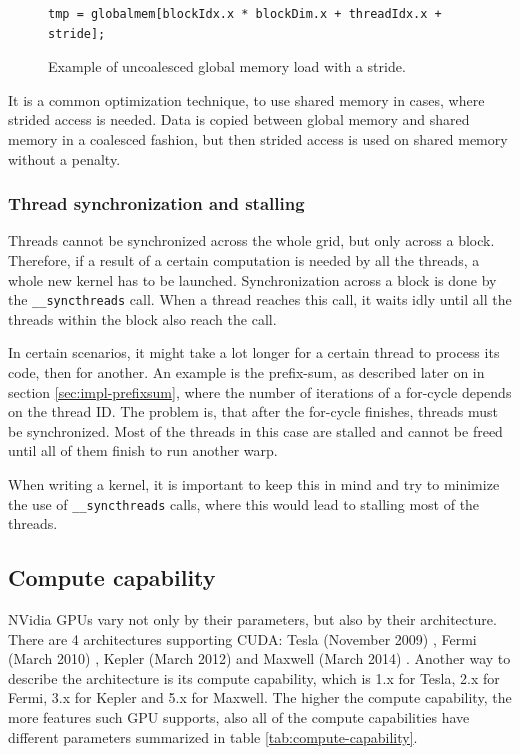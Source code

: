 \begin{figure}[ht]
\begin{verbatim}
tmp = globalmem[blockIdx.x * blockDim.x + threadIdx.x + stride];
\end{verbatim}
\caption{Example of uncoalesced global memory load with a stride.}\label{code:uncoalesced}
\end{figure}

It is a common optimization technique, to use shared memory in cases, where strided access is needed. Data is copied between global memory and shared memory in a coalesced fashion, but then strided access is used on shared memory without a penalty.

\subsubsection{Thread synchronization and stalling}\label{subsubsec:cuda-thread-sync-stall}

Threads cannot be synchronized across the whole grid, but only across a block. Therefore, if a result of a certain computation is needed by all the threads, a whole new kernel has to be launched. Synchronization across a block is done by the \verb|__syncthreads| call. When a thread reaches this call, it waits idly until all the threads within the block also reach the call.

In certain scenarios, it might take a lot longer for a certain thread to process its code, then for another. An example is the prefix-sum, as described later on in section \ref{sec:impl-prefixsum}, where the number of iterations of a for-cycle depends on the thread ID. The problem is, that after the for-cycle finishes, threads must be synchronized. Most of the threads in this case are stalled and cannot be freed until all of them finish to run another warp.

When writing a kernel, it is important to keep this in mind and try to minimize the use of \verb|__syncthreads| calls, where this would lead to stalling most of the threads.

\subsection{Compute capability}\label{subsec:cuda-compute-capability}

NVidia GPUs vary not only by their parameters, but also by their architecture. There are 4 architectures supporting CUDA: Tesla (November 2009) \cite{lindholm2008nvidia}, Fermi (March 2010) \cite{fermi-whitepaper}, Kepler (March 2012) \cite{kepler-whitepaper} and Maxwell (March 2014) \cite{maxwell-whitepaper}. Another way to describe the architecture is its compute capability, which is 1.x for Tesla, 2.x for Fermi, 3.x for Kepler and 5.x for Maxwell. The higher the compute capability, the more features such GPU supports, also all of the compute capabilities have different parameters summarized in table \ref{tab:compute-capability}.

